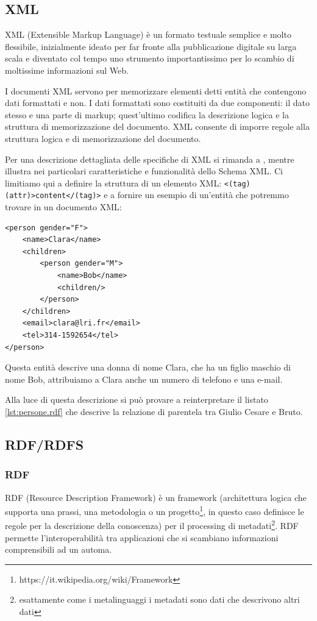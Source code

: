 \subsection{XML}
XML (Extensible Markup Language) è un formato testuale semplice e molto flessibile, inizialmente ideato per far fronte alla pubblicazione digitale su larga scala e diventato col tempo uno strumento importantissimo per lo scambio di moltissime informazioni sul Web\cite{w3cXml}.

I documenti XML servono per memorizzare elementi detti entità che contengono dati formattati e non. I dati formattati sono costituiti da due componenti: il dato stesso e una parte di markup; quest'ultimo codifica la descrizione logica e la struttura di memorizzazione del documento. XML consente di imporre regole alla struttura logica e di memorizzazione del documento\cite{world2006extensible}.

Per una descrizione dettagliata delle specifiche di XML si rimanda a \cite{world2006extensible}, mentre \cite{li2005testing} illustra nei particolari caratteristiche e funzionalità dello Schema XML. Ci limitiamo qui a definire la struttura di un elemento XML: \verb|<(tag) (attr)>content</(tag)>| e a fornire un esempio di un'entità che potremmo trovare in un documento XML:
\begin{verbatim}
<person gender="F">
	<name>Clara</name>
	<children>
		<person gender="M">
			<name>Bob</name>
			<children/>
		</person>
	</children>
	<email>clara@lri.fr</email>
	<tel>314-1592654</tel>
</person>
\end{verbatim}
Questa entità descrive una donna di nome Clara, che ha un figlio maschio di nome Bob, attribuiamo a Clara anche un numero di telefono e una e-mail.

Alla luce di questa descrizione si può provare a reinterpretare il listato \ref{lst:persone.rdf} che descrive la relazione di parentela tra Giulio Cesare e Bruto.
\subsection{RDF/RDFS}
\subsubsection{RDF}
RDF (Resource Description Framework) è un framework (architettura logica che supporta una prassi, una metodologia o un progetto\footnote{https://it.wikipedia.org/wiki/Framework}, in questo caso definisce le regole per la descrizione della conoscenza) per il processing di metadati\footnote{esattamente come i metalinguaggi i metadati sono dati che descrivono altri dati}. RDF permette l'interoperabilità tra applicazioni che si scambiano informazioni comprensibili ad un automa.

